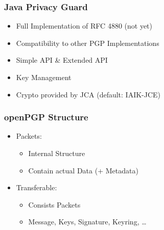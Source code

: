 \documentclass{beamer}
\begin{document}
\begin{frame}
	\frametitle{Java Privacy Guard}
	
	\begin{itemize}
		\item Full Implementation of RFC 4880 (not yet)
		\item Compatibility to other PGP Implementations
		\item Simple API \&{} Extended API
		\item Key Management
	\end{itemize}
	
	\begin{itemize}
		\item Crypto provided by JCA (default: IAIK-JCE)
	\end{itemize}
	
\end{frame}


\begin{frame}


	\frametitle{openPGP Structure}
	
	\begin{itemize}
		\item Packets: 
		\begin{itemize}
			\item Internal Structure
			\item Contain actual Data (+ Metadata)
		\end{itemize}
		
		\item Transferable:
		\begin{itemize}
			\item Consists Packets
			\item Message, Keys, Signature, Keyring, \ldots
		\end{itemize}
	\end{itemize}
	

\end{frame}
\end{document}
